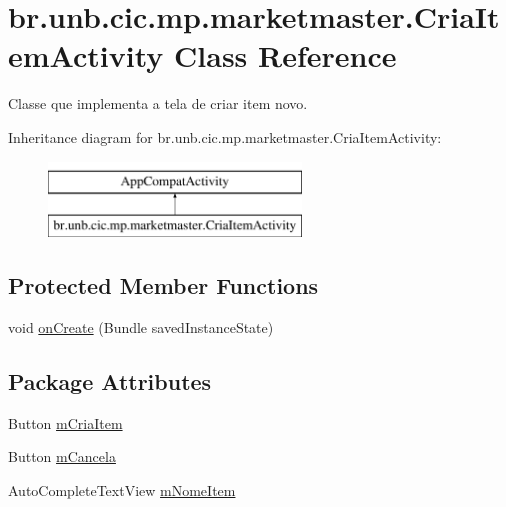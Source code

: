 \hypertarget{classbr_1_1unb_1_1cic_1_1mp_1_1marketmaster_1_1CriaItemActivity}{}\section{br.\+unb.\+cic.\+mp.\+marketmaster.\+Cria\+Item\+Activity Class Reference}
\label{classbr_1_1unb_1_1cic_1_1mp_1_1marketmaster_1_1CriaItemActivity}


Classe que implementa a tela de criar item novo.  


Inheritance diagram for br.\+unb.\+cic.\+mp.\+marketmaster.\+Cria\+Item\+Activity\+:\begin{figure}[H]
\begin{center}
\leavevmode
\includegraphics[height=2.000000cm]{classbr_1_1unb_1_1cic_1_1mp_1_1marketmaster_1_1CriaItemActivity}
\end{center}
\end{figure}
\subsection*{Protected Member Functions}
\begin{DoxyCompactItemize}
\item 
void \mbox{\hyperlink{classbr_1_1unb_1_1cic_1_1mp_1_1marketmaster_1_1CriaItemActivity_aa64ce86007e53df5dfa6995caa852d07}{on\+Create}} (Bundle saved\+Instance\+State)
\end{DoxyCompactItemize}
\subsection*{Package Attributes}
\begin{DoxyCompactItemize}
\item 
Button \mbox{\hyperlink{classbr_1_1unb_1_1cic_1_1mp_1_1marketmaster_1_1CriaItemActivity_a1047004644733253818603364e176c37}{m\+Cria\+Item}}
\item 
Button \mbox{\hyperlink{classbr_1_1unb_1_1cic_1_1mp_1_1marketmaster_1_1CriaItemActivity_a1592397486488e3cf1c6308292625e6c}{m\+Cancela}}
\item 
Auto\+Complete\+Text\+View \mbox{\hyperlink{classbr_1_1unb_1_1cic_1_1mp_1_1marketmaster_1_1CriaItemActivity_ad280bb606c6df48ba2c248e0e02392db}{m\+Nome\+Item}}
\end{DoxyCompactItemize}
